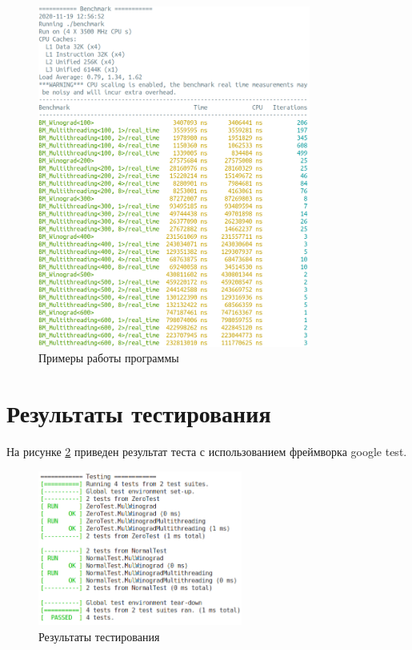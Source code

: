\begin{figure}[h]
    \centering
    \includegraphics[width=0.8\textwidth]{4/inc/e2.png}
    \caption{Примеры работы программы}
    \label{fig:4.2}
\end{figure}

\pagebreak
\section{Результаты тестирования}

На рисунке \ref{fig:4.3} приведен результат теста с использованием фреймворка google test.

\begin{figure}[h]
    \centering
    \includegraphics[width=0.6\textwidth]{4/inc/test.png}
    \caption{Результаты тестирования}
    \label{fig:4.3}
\end{figure}


